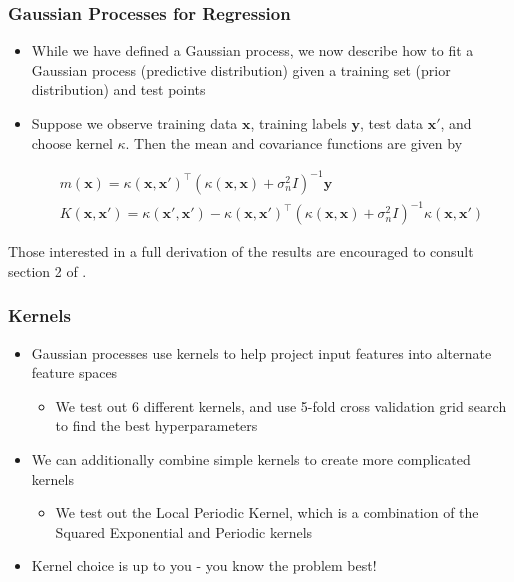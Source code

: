 \documentclass[pdf]{beamer}
\newcommand{\bx}{\boldsymbol{x}}
\newcommand{\by}{\boldsymbol{y}}
\begin{document}
\begin{frame}
  \frametitle{Gaussian Processes for Regression}

  \begin{itemize}
    \item While we have defined a Gaussian process, we now describe how to fit a Gaussian process (predictive
      distribution) given a training set (prior distribution) and test points
    \item Suppose we observe training data $\bx$, training labels $\by$, test data $\bx'$, and choose kernel $\kappa$.
      Then the mean and covariance functions are given by 

      \begin{gather*}
        m(\boldsymbol{x})=\kappa(\bx, \bx')^\top \left(\kappa(\bx, \bx) + \sigma_{n}^{2} I\right)^{-1} \by \\
        K(\boldsymbol{x},\boldsymbol{x'}) = \kappa(\bx', \bx') - \kappa(\bx, \bx')^{\top}\left(\kappa(\bx, \bx) +
        \sigma_{n}^{2}I\right)^{-1}\kappa(\bx, \bx')
      \end{gather*}
  \end{itemize}

  Those interested in a full derivation of the results are encouraged to consult section 2 of
  \cite{rasmussen_gaussian_2006}.
\end{frame}

\begin{frame}
  \frametitle{Kernels}
  \begin{itemize}
    \item Gaussian processes use kernels to help project input features into alternate feature
      spaces\cite{duvenaud_automatic_2014}
      \begin{itemize}
        \item We test out 6 different kernels, and use 5-fold cross validation grid search to find the best
          hyperparameters
      \end{itemize}
    \item We can additionally combine simple kernels to create more complicated kernels
    \begin{itemize}
      \item We test out the Local Periodic Kernel, which is a combination of the Squared Exponential and Periodic
        kernels
    \end{itemize}
    \item Kernel choice is up to you - you know the problem best!
  \end{itemize}
\end{frame}
\end{document}
